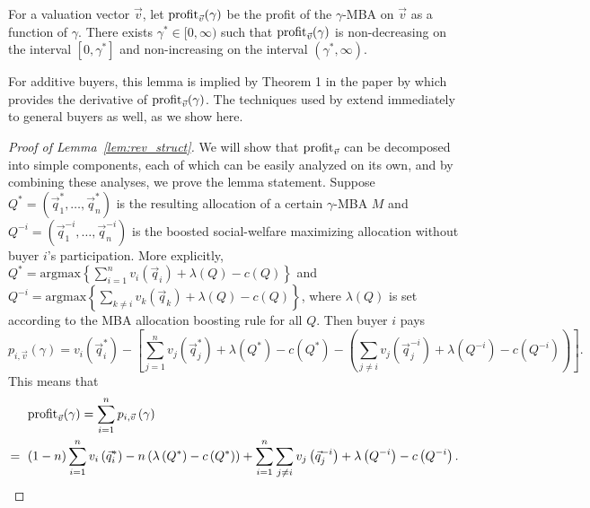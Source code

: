 \begin{lemma}\label{lem:rev_struct}
For a valuation vector $\vec{v}$, let $\textnormal{profit}_{\vec{v}}(\gamma)$ be the profit of the $\gamma$-MBA on $\vec{v}$ as a function of $\gamma$. There exists $\gamma^* \in [0,\infty)$ such that ${\normalfont \textnormal{profit}}_{\vec{v}}(\gamma)$ is non-decreasing on the interval $[0,\gamma^*]$ and non-increasing on the interval $(\gamma^*, \infty)$.
\end{lemma}

For additive buyers, this lemma is implied by Theorem 1 in the paper by \citet{Jehiel07:Mixed} which provides the derivative of $\textnormal{profit}_{\vec{v}}(\gamma)$. The techniques used by \citet{Jehiel07:Mixed} extend immediately to general buyers as well, as we show here.

\begin{proof}[Proof of Lemma~\ref{lem:rev_struct}]
We will show that ${\normalfont \textnormal{profit}}_{\vec{v}}$ can be decomposed into simple components, each of which can be easily analyzed on its own, and by combining these analyses, we prove the lemma statement. Suppose $Q^* = \left(\vec{q}_1^*, \dots, \vec{q}_n^*\right)$ is the resulting allocation of a certain $\gamma$-MBA $M$ and $Q^{-i} = \left(\vec{q}_1^{-i}, \dots, \vec{q}_n^{-i}\right)$ is the boosted social-welfare maximizing allocation without buyer $i$'s participation. More explicitly, $Q^* = \text{argmax} \left\{\sum_{i = 1}^n v_i\left(\vec{q}_i\right) + \lambda\left(Q\right) - c(Q) \right\}$ and $Q^{-i} = \text{argmax} \left\{\sum_{k \not=i} v_k\left(\vec{q}_k\right) + \lambda\left(Q\right) - c(Q)\right\}$, where $\lambda\left(Q\right)$ is set according to the MBA allocation boosting rule for all $Q$. Then buyer $i$ pays \[p_{i, \vec{v}}\left(\gamma\right) = v_i\left(\vec{q}^*_i\right) - \left[\sum_{j = 1}^n v_j\left(\vec{q}^*_j\right) + \lambda\left(Q^*\right) - c(Q^*) - \left(\sum_{j \not= i} v_j\left(\vec{q}^{-i}_j\right) + \lambda\left(Q^{-i}\right) - c(Q^{-i}) \right)\right].\] This means that \begin{align*}&{\normalfont \textnormal{profit}}_{\vec{v}}(\gamma) = \sum_{i = 1}^n p_{i, \vec{v}}\left(\gamma\right)\\
= \text{ } &(1 - n)\sum_{i = 1}^n v_i\left(\vec{q}_i^*\right) - n\left(\lambda\left(Q^*\right) - c\left(Q^*\right)\right) + \sum_{i = 1}^n \sum_{j \not= i} v_j\left(\vec{q}_j^{-i}\right) + \lambda\left(Q^{-i}\right) - c\left(Q^{-i}\right).\end{align*}


\end{proof}
